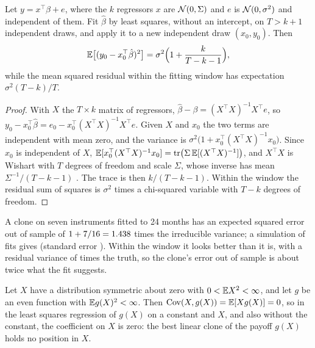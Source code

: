 \begin{chapterrefs}
\begin{proposition}\label{prop9:clone}
Let $y=x^\top\beta+e$, where the $k$ regressors $x$ are $\mathcal{N}(0,\Sigma)$ and $e$ is $\mathcal{N}(0,\sigma^2)$ and
independent of them. Fit $\hat\beta$ by least squares, without an intercept, on $T>k+1$ independent
draws, and apply it to a new independent draw $(x_0,y_0)$. Then
\begin{equation}\label{eq9:clone}
  \mathbb{E}\bigl[(y_0-x_0^\top\hat\beta)^2\bigr] = \sigma^2\Bigl(1+\frac{k}{T-k-1}\Bigr),
\end{equation}
while the mean squared residual within the fitting window has expectation $\sigma^2(T-k)/T$.
\end{proposition}

\begin{proof}
With $X$ the $T\times k$ matrix of regressors, $\hat\beta-\beta=(X^\top X)^{-1}X^\top e$, so
$y_0-x_0^\top\hat\beta=e_0-x_0^\top(X^\top X)^{-1}X^\top e$. Given $X$ and $x_0$ the two terms are
independent with mean zero, and the variance is $\sigma^2\bigl(1+x_0^\top(X^\top X)^{-1}x_0\bigr)$. Since $x_0$
is independent of $X$, $\mathbb{E}[x_0^\top(X^\top X)^{-1}x_0]=\operatorname{tr}\bigl(\Sigma\,\mathbb{E}[(X^\top X)^{-1}]\bigr)$, and
$X^\top X$ is Wishart with $T$ degrees of freedom and scale $\Sigma$, whose inverse has mean
$\Sigma^{-1}/(T-k-1)$ \parencite{muirhead1982}. The trace is then $k/(T-k-1)$. Within the window the
residual sum of squares is $\sigma^2$ times a chi-squared variable with $T-k$ degrees of freedom.
\end{proof}

A clone on seven instruments fitted to 24 months has an expected squared error out of sample of
$1+7/16=1.438$ times the irreducible variance; a simulation of \pvSims{} fits gives \pvSim{}
(standard error \pvSimSe). Within the window it looks better than it is, with a residual variance of
\pvInSample{} times the truth, so the clone's error out of sample is about twice what the fit suggests.

\begin{proposition}\label{prop9:linear}
Let $X$ have a distribution symmetric about zero with $0<\mathbb{E} X^2<\infty$, and let $g$ be an even function
with $\mathbb{E} g(X)^2<\infty$. Then $\operatorname{Cov}(X,g(X))=\mathbb{E}[Xg(X)]=0$, so in the least squares regression of $g(X)$ on a
constant and $X$, and also without the constant, the coefficient on $X$ is zero:
the best linear clone of the payoff $g(X)$ holds no position in $X$.
\end{proposition}


\end{chapterrefs}
